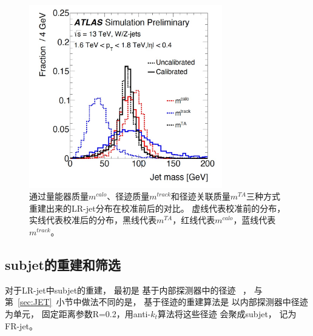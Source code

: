 \begin{figure}
  \begin{center}
    \includegraphics[width=0.75\textwidth]{figuresXbb/LRMASS.jpg}
  \end{center}
  \caption{
  通过量能器质量$m^{calo}$、径迹质量$m^{track}$和径迹关联质量$m^{TA}$三种方式重建出来的LR-jet分布在校准前后的对比。
  虚线代表校准前的分布，实线代表校准后的分布，黑线代表$m^{TA}$，红线代表$m^{calo}$，蓝线代表$m^{track}$。
  }
    \label{fig:LRMASS}
\end{figure}



\subsection{subjet的重建和筛选}
\label{sec:XbbORSR}

对于LR-jet中subjet的重建，
最初是
基于内部探测器中的径迹
~\cite{TAGGING1,TAGGING5}，
与第~\ref{sec:JET}~小节中做法不同的是，
基于径迹的重建算法是
以内部探测器中径迹为单元，
固定距离参数R=0.2，用anti-$k_t$算法将这些径迹
会聚成subjet，
记为FR-jet。

